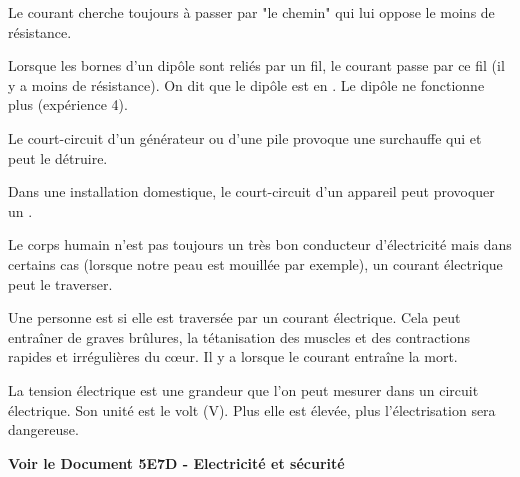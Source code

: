 \documentclass[11pt,a4paper]{article}
\begin{document}

Le courant cherche toujours à passer par "le chemin" qui lui oppose le moins de résistance.

Lorsque les bornes d’un dipôle sont reliés par un fil, le courant passe par ce fil (il y a moins de résistance). On dit que le dipôle est en . Le dipôle ne fonctionne plus (expérience 4).

\newpage



Le court-circuit d’un générateur ou d’une pile provoque une surchauffe qui  et peut le détruire.

Dans une installation domestique, le court-circuit d’un appareil peut provoquer un .


Le corps humain n’est pas toujours un très bon conducteur d’électricité mais dans certains cas (lorsque notre peau est mouillée par exemple), un courant électrique peut le traverser.

Une personne est  si elle est traversée par un courant électrique. Cela peut entraîner de graves brûlures, la tétanisation des muscles et des contractions rapides et irrégulières du cœur. Il y a  lorsque le courant entraîne la mort.

La tension électrique est une grandeur que l’on peut mesurer dans un circuit électrique. Son unité est le volt (V). Plus elle est élevée, plus l’électrisation sera dangereuse.

\textbf{Voir le Document 5E7D - Electricité et sécurité}
\end{document}
